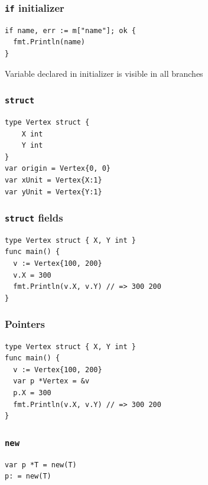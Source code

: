 \documentclass[xetex,mathserif,serif,12pt]{beamer}
\begin{document}
\begin{frame}[fragile]
  \frametitle{\texttt{if} initializer}

  \begin{beamer@nomargin}
    \begin{lstlisting}
if name, err := m["name"]; ok {
  fmt.Println(name)
}
    \end{lstlisting}
  \end{beamer@nomargin}

  Variable declared in initializer is visible in all branches
\end{frame}

\begin{frame}[fragile]
  \frametitle{\texttt{struct}}

  \begin{beamer@nomargin}
    \begin{lstlisting}
type Vertex struct {
    X int
    Y int
}
var origin = Vertex{0, 0}
var xUnit = Vertex{X:1}
var yUnit = Vertex{Y:1}
    \end{lstlisting}
  \end{beamer@nomargin}
\end{frame}

\begin{frame}[fragile]
  \frametitle{\texttt{struct} fields}

  \begin{beamer@nomargin}
    \begin{lstlisting}
type Vertex struct { X, Y int }
func main() {
  v := Vertex{100, 200}
  v.X = 300
  fmt.Println(v.X, v.Y) // => 300 200
}
    \end{lstlisting}
  \end{beamer@nomargin}
\end{frame}

\begin{frame}[fragile]
  \frametitle{Pointers}

  \begin{beamer@nomargin}
    \begin{lstlisting}
type Vertex struct { X, Y int }
func main() {
  v := Vertex{100, 200}
  var p *Vertex = &v
  p.X = 300
  fmt.Println(v.X, v.Y) // => 300 200
}
    \end{lstlisting}
  \end{beamer@nomargin}
\end{frame}

\begin{frame}[fragile]
  \frametitle{\texttt{new}}

  \begin{beamer@nomargin}
    \begin{lstlisting}
var p *T = new(T)
p: = new(T)
    \end{lstlisting}
  \end{beamer@nomargin}
\end{frame}
\end{document}
